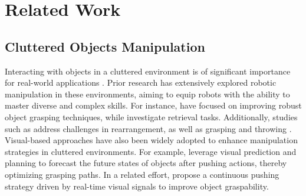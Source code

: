 \section{Related Work}
\subsection{Cluttered Objects Manipulation}
Interacting with objects in a cluttered environment is of significant importance for real-world applications \cite{6907059, 1087038, 9197318}. Prior research has extensively explored robotic manipulation in these environments, aiming to equip robots with the ability to master diverse and complex skills. For instance, \citet{9197318, 10342335} have focused on improving robust object grasping techniques, while \citet{li2024broadcasting, 10611541} investigate retrieval tasks. Additionally, studies such as \citet{goyal2022ifor, pmlr-v205-tang23a, jia2024cluttergen} address challenges in rearrangement, as well as grasping and throwing \cite{kasaei2024harnessing}. Visual-based approaches have also been widely adopted to enhance manipulation strategies in cluttered environments. For example, \citet{9591286} leverage visual prediction and planning to forecast the future states of objects after pushing actions, thereby optimizing grasping paths. In a related effort, \citet{9341545} propose a continuous pushing strategy driven by real-time visual signals to improve object graspability.

